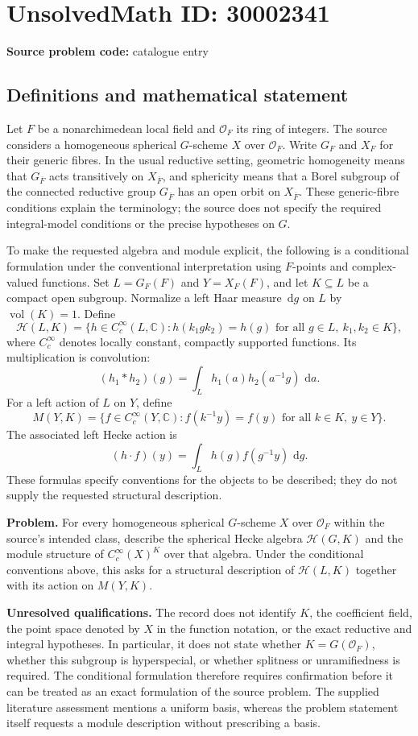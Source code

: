 \documentclass[11pt]{article}
\newcommand{\C}{\mathbb{C}}
\newcommand{\dd}{\,\mathrm{d}}
\begin{document}
\section*{UnsolvedMath ID: 30002341}
\textbf{Source problem code:} catalogue entry
\subsection{Definitions and mathematical statement}
Let \(F\) be a nonarchimedean local field and \(\mathcal O_F\) its ring of integers. The source considers a homogeneous spherical \(G\)-scheme \(X\) over \(\mathcal O_F\). Write \(G_F\) and \(X_F\) for their generic fibres. In the usual reductive setting, geometric homogeneity means that \(G_{\overline F}\) acts transitively on \(X_{\overline F}\), and sphericity means that a Borel subgroup of the connected reductive group \(G_{\overline F}\) has an open orbit on \(X_{\overline F}\). These generic-fibre conditions explain the terminology; the source does not specify the required integral-model conditions or the precise hypotheses on \(G\).

To make the requested algebra and module explicit, the following is a conditional formulation under the conventional interpretation using \(F\)-points and complex-valued functions. Set \(L=G_F(F)\) and \(Y=X_F(F)\), and let \(K\subseteq L\) be a compact open subgroup. Normalize a left Haar measure \(\dd g\) on \(L\) by \(\operatorname{vol}(K)=1\). Define
\[
\mathcal H(L,K)=\{h\in C_c^\infty(L,\C):h(k_1gk_2)=h(g)\text{ for all }g\in L,\ k_1,k_2\in K\},
\]
where \(C_c^\infty\) denotes locally constant, compactly supported functions. Its multiplication is convolution:
\[
(h_1*h_2)(g)=\int_L h_1(a)h_2(a^{-1}g)\,\dd a.
\]
For a left action of \(L\) on \(Y\), define
\[
M(Y,K)=\{f\in C_c^\infty(Y,\C):f(k^{-1}y)=f(y)\text{ for all }k\in K,\ y\in Y\}.
\]
The associated left Hecke action is
\[
(h\cdot f)(y)=\int_L h(g)f(g^{-1}y)\,\dd g.
\]
These formulas specify conventions for the objects to be described; they do not supply the requested structural description.

\textbf{Problem.} For every homogeneous spherical \(G\)-scheme \(X\) over \(\mathcal O_F\) within the source's intended class, describe the spherical Hecke algebra \(\mathcal H(G,K)\) and the module structure of \(C_c^\infty(X)^K\) over that algebra. Under the conditional conventions above, this asks for a structural description of \(\mathcal H(L,K)\) together with its action on \(M(Y,K)\).

\textbf{Unresolved qualifications.} The record does not identify \(K\), the coefficient field, the point space denoted by \(X\) in the function notation, or the exact reductive and integral hypotheses. In particular, it does not state whether \(K=G(\mathcal O_F)\), whether this subgroup is hyperspecial, or whether splitness or unramifiedness is required. The conditional formulation therefore requires confirmation before it can be treated as an exact formulation of the source problem. The supplied literature assessment mentions a uniform basis, whereas the problem statement itself requests a module description without prescribing a basis.
\end{document}
